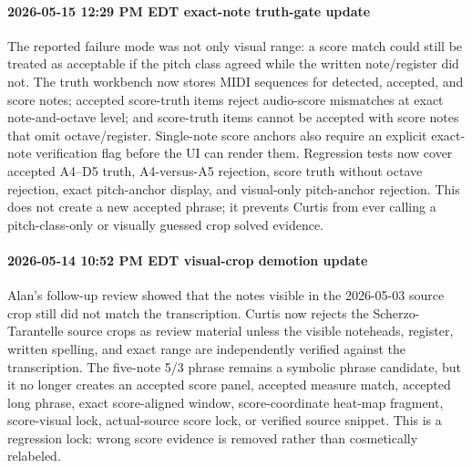 \paragraph{2026-05-15 12:29 PM EDT exact-note truth-gate update} The reported failure mode was not only visual range: a score match could still be treated as acceptable if the pitch class agreed while the written note/register did not. The truth workbench now stores MIDI sequences for detected, accepted, and score notes; accepted score-truth items reject audio-score mismatches at exact note-and-octave level; and score-truth items cannot be accepted with score notes that omit octave/register. Single-note score anchors also require an explicit exact-note verification flag before the UI can render them. Regression tests now cover accepted A4--D5 truth, A4-versus-A5 rejection, score truth without octave rejection, exact pitch-anchor display, and visual-only pitch-anchor rejection. This does not create a new accepted phrase; it prevents Curtis from ever calling a pitch-class-only or visually guessed crop solved evidence.

\paragraph{2026-05-14 10:52 PM EDT visual-crop demotion update} Alan's follow-up review showed that the notes visible in the 2026-05-03 source crop still did not match the transcription. Curtis now rejects the Scherzo-Tarantelle source crops as review material unless the visible noteheads, register, written spelling, and exact range are independently verified against the transcription. The five-note 5/3 phrase remains a symbolic phrase candidate, but it no longer creates an accepted score panel, accepted measure match, accepted long phrase, exact score-aligned window, score-coordinate heat-map fragment, score-visual lock, actual-source score lock, or verified source snippet. This is a regression lock: wrong score evidence is removed rather than cosmetically relabeled.


